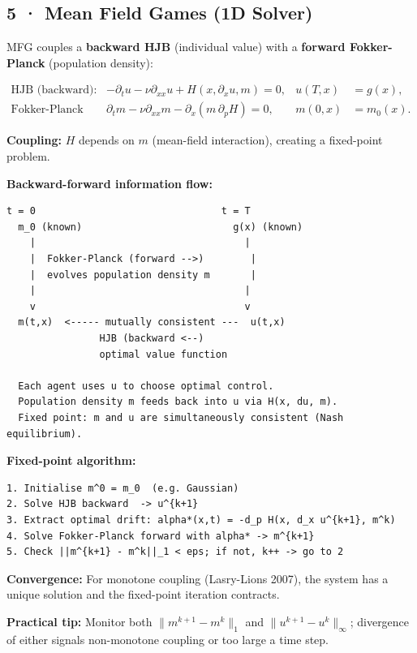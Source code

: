 \documentclass[11pt,a4paper]{article}
\begin{document}
\subsection{5 · Mean Field Games (1D Solver)}\label{mean-field-games-1d-solver}

MFG couples a \textbf{backward HJB} (individual value) with a \textbf{forward Fokker-Planck} (population density):

\[\begin{aligned}
\text{HJB (backward): } &
-\partial_t u - \nu\partial_{xx}u + H(x,\partial_x u, m) = 0, & u(T,x)&=g(x),\\
\text{Fokker-Planck (forward): } &
\partial_t m - \nu\partial_{xx}m - \partial_x(m\,\partial_p H) = 0, & m(0,x)&=m_0(x).
\end{aligned}\]

\textbf{Coupling:} \(H\) depends on \(m\) (mean-field interaction), creating a fixed-point problem.

\textbf{Backward-forward information flow:}

\begin{verbatim}
t = 0                                t = T
  m_0 (known)                          g(x) (known)
    |                                    |
    |  Fokker-Planck (forward -->)        |
    |  evolves population density m       |
    |                                    |
    v                                    v
  m(t,x)  <----- mutually consistent ---  u(t,x)
                HJB (backward <--)
                optimal value function

  Each agent uses u to choose optimal control.
  Population density m feeds back into u via H(x, du, m).
  Fixed point: m and u are simultaneously consistent (Nash equilibrium).
\end{verbatim}

\textbf{Fixed-point algorithm:}

\begin{verbatim}
1. Initialise m^0 = m_0  (e.g. Gaussian)
2. Solve HJB backward  -> u^{k+1}
3. Extract optimal drift: alpha*(x,t) = -d_p H(x, d_x u^{k+1}, m^k)
4. Solve Fokker-Planck forward with alpha* -> m^{k+1}
5. Check ||m^{k+1} - m^k||_1 < eps; if not, k++ -> go to 2
\end{verbatim}

\textbf{Convergence:} For monotone coupling (Lasry-Lions 2007), the system has a unique solution and the fixed-point iteration contracts.

\textbf{Practical tip:} Monitor both \(\|m^{k+1}-m^k\|_1\) and \(\|u^{k+1}-u^k\|_\infty\); divergence of either signals non-monotone coupling or too large a time step.
\end{document}
